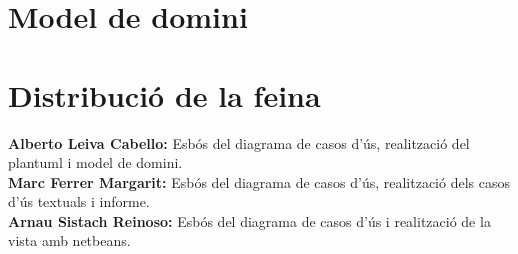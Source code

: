 \documentclass{article}
\begin{document}
\section{Model de domini}

\section{Distribuci\'o de la feina}
\textbf{Alberto Leiva Cabello:} Esb\'os del diagrama de casos d'\'us, realitzaci\'o del plantuml i model de domini.\\
\textbf{Marc Ferrer Margarit:} Esb\'os del diagrama de casos d'\'us, realitzaci\'o dels casos d'\'us textuals i informe.\\
\textbf{Arnau Sistach Reinoso:} Esb\'os del diagrama de casos d'\'us i realitzaci\'o de la vista amb netbeans.\\
\end{document}

